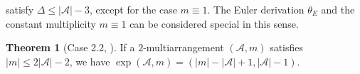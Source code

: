 \documentclass[12pt]{amsart}
\theoremstyle{definition}
\newtheorem{theorem}[definition]{Theorem}
\newtheorem{proposition}[definition]{Proposition}
\newcommand{\KK}{\mathbb{K}}
\newcommand{\AAA}{\mathcal{A}}
\newcommand{\Der}{\operatorname{Der}}
\begin{document}
    satisfy 
    $\Delta\leq|\AAA|-3$, except for the case 
    $m\equiv1$. 
    The Euler derivation $\theta_E$ and the constant multiplicity $m\equiv1$ can be considered special in this sense. 
\begin{theorem}[Case 2.2, \cite{Wakefield-Yuzvinsky}]\label{theorem:small}
    If a $2$-multiarrangement $(\AAA,m)$ satisfies 
    $|m|\leq2|\AAA|-2$, 
    we have $\exp(\AAA,m)=(|m|-|\AAA|+1,|\AAA|-1)$. 
\end{theorem}

%
%
\end{document}

